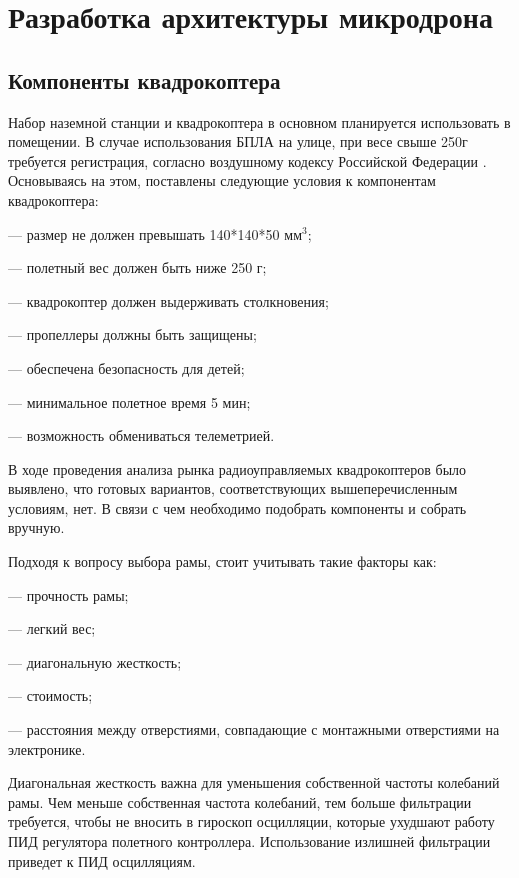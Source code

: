 
\section{Разработка архитектуры микродрона}
\subsection{Компоненты квадрокоптера}

Набор наземной станции и квадрокоптера в основном планируется использовать в помещении. В случае использования БПЛА на улице, при весе свыше 250г требуется регистрация, согласно воздушному кодексу Российской Федерации \cite{ivp}. Основываясь на этом, поставлены следующие условия к компонентам квадрокоптера:

--- размер не должен превышать 140*140*50 \(мм^3\);

--- полетный вес должен быть ниже 250 г;

--- квадрокоптер должен выдерживать столкновения;

--- пропеллеры должны быть защищены;

--- обеспечена безопасность для детей;

--- минимальное полетное время 5 мин;

--- возможность обмениваться телеметрией.

В ходе проведения анализа рынка радиоуправляемых квадрокоптеров было выявлено, что готовых вариантов, соответствующих вышеперечисленным условиям, нет. В связи с чем необходимо подобрать компоненты и собрать вручную.

Подходя к вопросу выбора рамы, стоит учитывать такие факторы как:

--- прочность рамы;

--- легкий вес;

--- диагональную жесткость;

--- стоимость;

--- расстояния между отверстиями, совпадающие с монтажными отверстиями на электронике.

Диагональная жесткость важна для уменьшения собственной частоты колебаний рамы. Чем меньше собственная частота колебаний, тем больше фильтрации требуется, чтобы не вносить в гироскоп осцилляции, которые ухудшают работу ПИД регулятора полетного контроллера. Использование излишней фильтрации приведет к ПИД осцилляциям.

